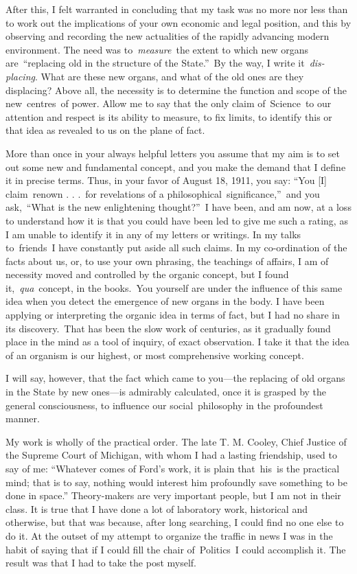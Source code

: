 \documentclass[twoside,symmetric,nobib,justified]{tufte-book}
\begin{document}
After this, I felt warranted in concluding that my task was no more nor
less than to work out the implications of your own economic and legal
position, and this by observing and recording the new actualities of the
rapidly advancing modern environment. The need was to~\emph{measure}~the
extent to which new organs are~``replacing old in the structure of the
State.''~By the way, I write it~\emph{dis-placing}. What are these new
organs, and what of the old ones are they displacing? Above all, the
necessity is to determine the function and scope of the new~centres~of
power. Allow me to say that the only claim of~Science~to our attention
and respect is its ability to measure, to fix limits, to identify this
or that idea as revealed to us on the plane of fact.~

More than once in your always helpful letters you assume that my aim is
to set out some new and fundamental concept, and you make the demand
that I define it in precise terms. Thus, in your favor of August 18,
1911, you say: ``You {[}I{]} claim~renown . . .~for revelations of a
philosophical~significance,''~and you ask,~``What is the new
enlightening thought?''~I have been, and am now, at a loss to understand
how it is that you could have been led to give me such a rating, as I am
unable to identify it in any of my letters or writings. In my talks
to~friends~I have constantly put aside all such claims. In my
co-ordination of the facts about us, or, to use your own phrasing, the
teachings of affairs, I am of necessity moved and controlled by the
organic concept, but I found it,~\emph{qua}~concept, in the books.~You
yourself are under the influence of this same idea when you detect the
emergence of new organs in the body. I have been applying or
interpreting the organic idea in terms of fact, but I had no share in
its discovery.~That has been the slow work of centuries, as it gradually
found place in the mind as a tool of inquiry, of exact observation. I
take it that the idea of an organism is our highest, or most
comprehensive working concept.~

\newpage I will say, however, that the fact which came to you---the replacing of
old organs in the State by new ones---is admirably calculated, once it
is grasped by the general consciousness, to influence our
social~philosophy in the profoundest manner.~

My work is wholly of the practical order. The late T. M. Cooley, Chief
Justice of the Supreme Court of Michigan, with whom I had a lasting
friendship, used to say of me: ``Whatever comes of Ford's work, it is
plain that~his~is the practical mind; that is to say, nothing would
interest him profoundly save something to be done in space.''
Theory-makers are very important people, but I am not in their class. It
is true that I have done a lot of laboratory work, historical and
otherwise, but that was because, after long searching, I could find no
one else to do it. At the outset of my attempt to organize the traffic
in news I was in the habit of saying that if I could fill the chair
of~Politics~I could accomplish it. The result was that I had to take the
post myself.~
\end{document}
